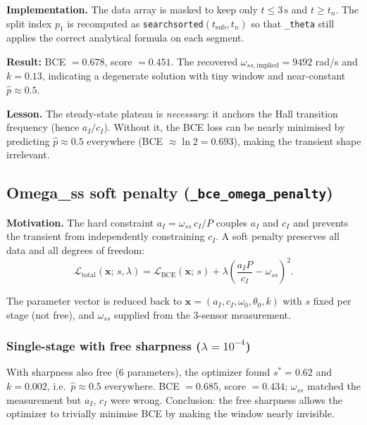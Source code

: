 \documentclass[11pt,a4paper]{article}
\begin{document}
\textbf{Implementation.}  The data array is masked to keep only
$t \leq 3\,\text{s}$ and $t \geq t_n$.  The split index $p_1$ is
recomputed as \texttt{searchsorted}$(t_{\text{sub}}, t_n)$ so that
\texttt{\_theta} still applies the correct analytical formula on each segment.

\textbf{Result:} BCE $=0.678$, score $=0.451$.  The recovered
$\omega_{ss,\text{implied}} = 9492$ rad/s and $k=0.13$, indicating a
degenerate solution with tiny window and near-constant $\hat{p}\approx 0.5$.

\textbf{Lesson.}  The steady-state plateau is \emph{necessary}: it anchors
the Hall transition frequency (hence $a_I/c_I$).  Without it, the BCE
loss can be nearly minimised by predicting $\hat{p}\approx 0.5$ everywhere
(BCE $\approx\ln 2 = 0.693$), making the transient shape irrelevant.

\subsection{Omega\_ss soft penalty (\texttt{\_bce\_omega\_penalty})}

\textbf{Motivation.}  The hard constraint $a_I = \omega_{ss}\,c_I/P$ couples
$a_I$ and $c_I$ and prevents the transient from independently constraining
$c_I$.  A soft penalty preserves all data and all degrees of freedom:
\begin{equation}\label{eq:penalty}
  \mathcal{L}_{\text{total}}(\mathbf{x};\,s,\lambda)
  = \mathcal{L}_{\text{BCE}}(\mathbf{x};\,s)
  + \lambda\!\left(\frac{a_I P}{c_I} - \omega_{ss}\right)^{\!2}.
\end{equation}

The parameter vector is reduced back to
$\mathbf{x}=(a_I,c_I,\omega_0,\theta_0,k)$ with $s$ fixed per stage (not
free), and $\omega_{ss}$ supplied from the 3-sensor measurement.

\subsubsection*{Single-stage with free sharpness ($\lambda=10^{-4}$)}

With sharpness also free (6 parameters), the optimizer found
$s^*=0.62$ and $k=0.002$, i.e.\ $\hat{p}\approx 0.5$ everywhere.
BCE $=0.685$, score $=0.434$; $\omega_{ss}$ matched the measurement but
$a_I$, $c_I$ were wrong.  Conclusion: the free sharpness allows the optimizer
to trivially minimise BCE by making the window nearly invisible.
\end{document}
